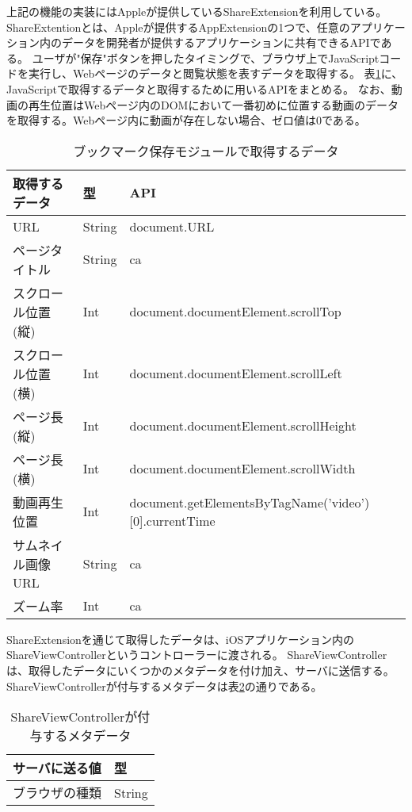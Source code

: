 上記の機能の実装にはAppleが提供しているShareExtension\cite{}を利用している。
ShareExtentionとは、Appleが提供するAppExtension\cite{app-extension}の1つで、任意のアプリケーション内のデータを開発者が提供するアプリケーションに共有できるAPIである。
ユーザが"保存"ボタンを押したタイミングで、ブラウザ上でJavaScriptコードを実行し、Webページのデータと閲覧状態を表すデータを取得する。
表\ref{tb:ios-data-js-api}に、JavaScriptで取得するデータと取得するために用いるAPIをまとめる。
なお、動画の再生位置はWebページ内のDOMにおいて一番初めに位置する動画のデータを取得する。Webページ内に動画が存在しない場合、ゼロ値は0である。

\begin{table}[htbp]
  \label{tb:ios-data-js-api}
  \caption{ブックマーク保存モジュールで取得するデータ}
  \begin{center}
    \begin{tabular}{|l|l|l|}
    \hline
    取得するデータ & 型 & API \\ \hline
    URL & String & document.URL \\ \hline
    ページタイトル & String & ca \\ \hline
    スクロール位置(縦) & Int & document.documentElement.scrollTop \\ \hline
    スクロール位置(横) & Int & document.documentElement.scrollLeft \\ \hline
    ページ長(縦) & Int & document.documentElement.scrollHeight \\ \hline
    ページ長(横) & Int & document.documentElement.scrollWidth \\ \hline
    動画再生位置 & Int & document.getElementsByTagName('video')[0].currentTime \\ \hline
    サムネイル画像URL & String & ca \\ \hline
    ズーム率 & Int & ca \\ \hline
    \end{tabular}
  \end{center}
\end{table}


ShareExtensionを通じて取得したデータは、iOSアプリケーション内のShareViewControllerというコントローラーに渡される。
ShareViewControllerは、取得したデータにいくつかのメタデータを付け加え、サーバに送信する。
ShareViewControllerが付与するメタデータは表\ref{tb:ios-meta-data}の通りである。

\begin{table}[htbp]
  \label{tb:ios-meta-data}
  \caption{ShareViewControllerが付与するメタデータ}
  \begin{center}
    \begin{tabular}{|l|l|}
    \hline
    サーバに送る値 & 型 \\ \hline
    ブラウザの種類 & String \\ \hline
    \end{tabular}
  \end{center}
\end{table}

